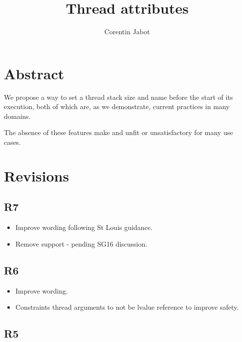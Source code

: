 \documentclass{wg21}
\title{Thread attributes}
\author{Corentin Jabot}{corentin.jabot@gmail.com}
\begin{document}
\maketitle

\setlength{\arrayrulewidth}{0.2mm}
\setlength{\tabcolsep}{8pt}
\renewcommand{\arraystretch}{1.}

\def\changemargin#1#2{\list{}{\rightmargin#2\leftmargin#1}\item[]}
\let\endchangemargin=\endlist
\setlength\extrarowheight{5pt}


\section{Abstract}

We propose a way to set a thread stack size and name before the start of its execution, both of which are,
as we demonstrate, current practices in many domains.

The absence of these features make  and  unfit or unsatisfactory for many use cases.

\section{Revisions}

\subsection{R7}
\begin{itemize}
\item Improve wording following St Louis guidance.
\item Remove  support - pending SG16 discussion.
\end{itemize}
\subsection{R6}

\begin{itemize}
\item Improve wording.
\item Constraints thread arguments to not be lvalue reference to improve safety.
\end{itemize}

\subsection{R5}
\end{document}
